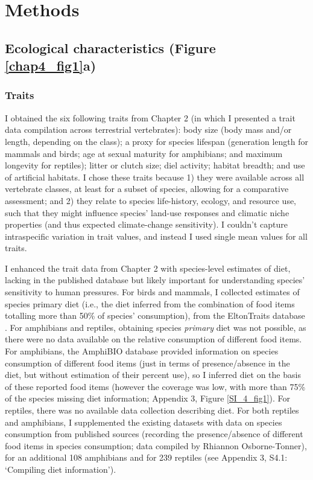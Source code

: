 \clearpage

\section{Methods}

\subsection{Ecological characteristics (Figure \ref{chap4_fig1}a)}

\subsubsection{Traits}

I obtained the six following traits from Chapter 2 (in which I presented a trait data compilation across terrestrial vertebrates): body size (body mass and/or length, depending on the class); a proxy for species lifespan (generation length for mammals and birds; age at sexual maturity for amphibians; and maximum longevity for reptiles); litter or clutch size; diel activity; habitat breadth; and use of artificial habitats. I chose these traits because 1) they were available across all vertebrate classes, at least for a subset of species, allowing for a comparative assessment; and 2) they relate to species life-history, ecology, and resource use, such that they might influence species' land-use responses and climatic niche properties (and thus expected climate-change sensitivity). I couldn't capture intraspecific variation in trait values, and instead I used single mean values for all traits.

I enhanced the trait data from Chapter 2 with species-level estimates of diet, lacking in the published database but likely important for understanding species' sensitivity to human pressures. For birds and mammals, I collected estimates of species primary diet (i.e., the diet inferred from the combination of food items totalling more than 50\% of species’ consumption), from the EltonTraits database \citep{Wilman2014}. For amphibians and reptiles, obtaining species \textit{primary} diet was not possible, as there were no data available on the relative consumption of different food items. For amphibians, the AmphiBIO database \citep{Oliveira2017} provided information on species consumption of different food items (just in terms of presence/absence in the diet, but without estimation of their percent use), so I inferred diet on the basis of these reported food items (however the coverage was low, with more than 75\% of the species missing diet information; Appendix 3, Figure \ref{SI_4_fig1}). For reptiles, there was no available data collection describing diet. For both reptiles and amphibians, I supplemented the existing datasets with data on species consumption from published sources (recording the presence/absence of different food items in species consumption; data compiled by Rhiannon Osborne-Tonner), for an additional 108 amphibians and for 239 reptiles (see Appendix 3, S4.1: `Compiling diet information'). 

